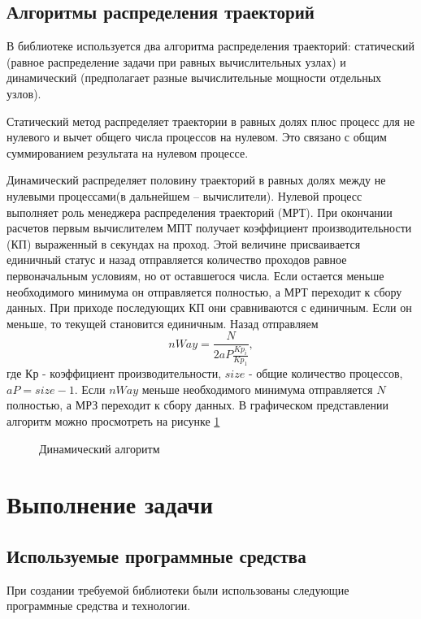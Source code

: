 \section{Алгоритмы распределения траекторий}
В библиотеке используется два алгоритма распределения траекторий: статический (равное распределение задачи при равных вычислительных узлах) и динамический (предполагает разные вычислительные мощности отдельных узлов).

Статический метод распределяет траектории в равных долях плюс процесс для не нулевого и вычет общего числа процессов на нулевом. Это связано с общим суммированием результата на нулевом процессе.

Динамический распределяет половину траекторий в равных долях между не нулевыми процессами(в дальнейшем -- вычислители). Нулевой процесс выполняет роль менеджера распределения траекторий (МРТ). При окончании расчетов первым вычислителем МПТ получает коэффициент производительности (КП) выраженный в секундах на проход. Этой величине присваивается единичный статус и назад отправляется количество проходов равное первоначальным условиям, но от оставшегося числа. Если остается меньше необходимого минимума он отправляется полностью, а МРТ переходит к сбору данных. При приходе последующих КП они сравниваются с единичным. Если он меньше, то текущей становится единичным. Назад отправляем \begin{equation} nWay = \frac{N}{2aP\frac{Kp_{i}}{Kp_{1}}}, \end{equation} где Кр - коэффициент производительности, $size$ - общие количество процессов, $aP=size-1$. Если $nWay$ меньше необходимого минимума отправляется $N$ полностью, а МРЗ переходит к сбору данных. В графическом представлении алгоритм можно просмотреть на рисунке \ref{staticAndDinamic}

\begin{figure}
\begin{small}

\end{small}
\caption{Динамический алгоритм}
\label{staticAndDinamic}
\end{figure}

\chapter{Выполнение задачи}
\section{Используемые программные средства}
При создании требуемой библиотеки были использованы следующие программные средства и технологии.   

